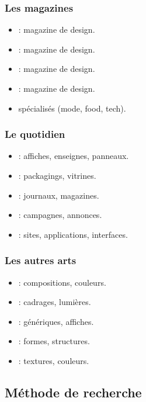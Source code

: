 \subsubsection{Les magazines}

\begin{itemize}
    \item {} : magazine de design.
    \item {} : magazine de design.
    \item {} : magazine de design.
    \item {} : magazine de design.
    \item {} spécialisés (mode, food, tech).
\end{itemize}

\subsubsection{Le quotidien}

\begin{itemize}
    \item {} : affiches, enseignes, panneaux.
    \item {} : packagings, vitrines.
    \item {} : journaux, magazines.
    \item {} : campagnes, annonces.
    \item {} : sites, applications, interfaces.
\end{itemize}

\subsubsection{Les autres arts}

\begin{itemize}
    \item {} : compositions, couleurs.
    \item {} : cadrages, lumières.
    \item {} : génériques, affiches.
    \item {} : formes, structures.
    \item {} : textures, couleurs.
\end{itemize}

\subsection{Méthode de recherche}

